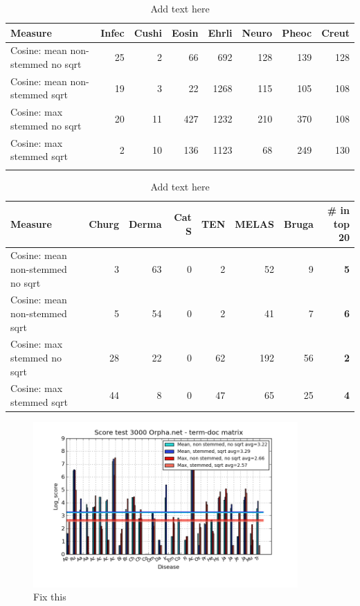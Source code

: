 \begin{table}[H]
  \begin{tiny}
  \caption{Add text here}
  \label{testResult}
  \begin{tabular}{|l|r|r|r|r|r|r|r|}
    \hline
    Measure &Infec&Cushi&Eosin&Ehrli&Neuro&Pheoc&Creut \\
    \hline
    Cosine: mean non-stemmed no sqrt &25&2&66&692&128&139&128 \\
    \hline
    Cosine: mean non-stemmed sqrt &19&3&22&1268&115&105&108 \\
    \hline
    Cosine: max stemmed no sqrt &20&11&427&1232&210&370&108 \\
    \hline
    Cosine: max stemmed sqrt &2&10&136&1123&68&249&130 \\
    \hline
  \multicolumn{8}{c}{} \\
  \end{tabular}
  \begin{tabular}{|l|r|r|r|r|r|r|r|}
    \hline
    Measure &Churg&Derma&Cat S&TEN&MELAS&Bruga& \scriptsize{\textbf{\# in top 20}} \\
    \hline
    Cosine: mean non-stemmed no sqrt &3&63&0&2&52&9 &\scriptsize{\textbf{5}} \\
    \hline
    Cosine: mean non-stemmed sqrt &5&54&0&2&41&7 &\scriptsize{\textbf{6}}\\
    \hline
    Cosine: max stemmed no sqrt &28&22&0&62&192&56 & \scriptsize{\textbf{2}} \\
    \hline
    Cosine: max stemmed sqrt &44&8&0&47&65&25 & \scriptsize{\textbf{4}} \\
    \hline
  \end{tabular}
  \end{tiny}
\end{table}

\begin{figure}[H]
        \begin{center}
          \includegraphics[width=0.9\textwidth]{barcharts/termDoc_orphan_hist_3000_ns_mea_ns_mea_sqr_s_max_s_max_sqr.png}
        \end{center}
        \caption{Fix this}
        \label{termDoc_orphan_hist_3000_ns_mea_ns_mea_sqr_s_max_s_max_sqr}
\end{figure}


